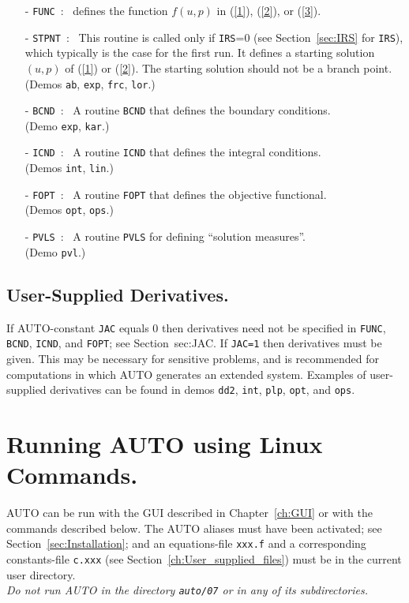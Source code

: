 \documentclass[12pt]{report}
\begin{document}
\begin{itemize}
\item[-] {\tt FUNC}~:~
  defines the function $f(u,p)$ in (\ref{1}), (\ref{2}), or (\ref{3}).
\item[-] {\tt STPNT}~:~
  This routine is called only if {\tt IRS}=0 
(see Section~\ref{sec:IRS} for {\tt IRS}),
  which typically is the case for the first run.
  It defines a starting solution $(u,p)$ of (\ref{1}) or (\ref{2}).
  The starting solution should not be a branch point.\\ 
  (Demos {\tt ab}, {\tt exp}, {\tt frc}, {\tt lor}.)  
\item[-] {\tt BCND}~:~ 
  A routine {\tt BCND} that defines the boundary conditions. \\
  (Demo {\tt exp}, {\tt kar}.)
\item[-] {\tt ICND}~:~ 
  A routine {\tt ICND} that defines the integral conditions. \\ 
  (Demos {\tt int}, {\tt lin}.)  
\item[-] {\tt FOPT}~:~ 
  A routine {\tt FOPT} that defines the objective functional. \\ 
  (Demos {\tt opt}, {\tt ops}.)  
\item[-] {\tt PVLS}~:~
  A routine {\tt PVLS} for defining ``solution measures''. \\
  (Demo {\tt pvl}.)
\end{itemize}
 
\section{ User-Supplied Derivatives.} \label{sec:derivatives}
If {\cal AUTO}-constant {\tt JAC} equals 0 
then derivatives need not be specified in 
{\tt FUNC}, {\tt BCND}, {\tt ICND}, and {\tt FOPT}; see Section~{sec:JAC}.
If {\tt JAC=1} then derivatives must be given.
This may be necessary for sensitive 
problems, and is recommended for computations in which {\cal AUTO} 
generates an extended system.
Examples of user-supplied derivatives can be found in
demos  {\tt dd2}, {\tt int}, {\tt plp}, {\tt opt}, and {\tt ops}.

\chapter{ Running {\cal AUTO} using Linux Commands.} \label{sec:command_mode}
{\cal AUTO} can be run with the GUI described in Chapter~\ref{ch:GUI} 
or with the commands described below.
The {\cal AUTO} aliases must have been activated; see Section~\ref{sec:Installation}; 
and an equations-file {\tt xxx.f} 
and a corresponding constants-file {\tt c.xxx} 
(see Section~\ref{ch:User_supplied_files})
must be in the current user directory.
\\
{\it Do not run {\cal AUTO} in the directory {\tt auto/07} 
or in any of its subdirectories.}
\end{document}
